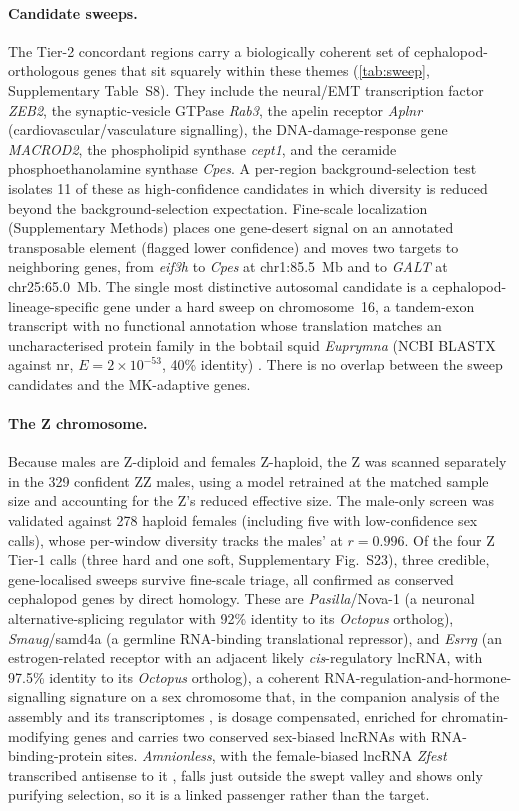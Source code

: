 \documentclass[11pt]{article}
\begin{document}
\paragraph{Candidate sweeps.}
The Tier-2 concordant regions carry a biologically coherent set of cephalopod-orthologous genes that sit
squarely within these themes (\cref{tab:sweep}, Supplementary Table~S8). They include the neural/EMT transcription factor
\textit{ZEB2}, the synaptic-vesicle GTPase \textit{Rab3}, the apelin receptor \textit{Aplnr}
(cardiovascular/vasculature signalling), the DNA-damage-response gene \textit{MACROD2}, the phospholipid
synthase \textit{cept1}, and the ceramide phosphoethanolamine synthase \textit{Cpes}. A per-region background-selection test isolates
11 of these as high-confidence candidates in which diversity is reduced beyond the background-selection expectation.
Fine-scale localization (Supplementary Methods) places one gene-desert signal on an annotated transposable element (flagged lower confidence) and moves two targets to neighboring genes, from \textit{eif3h} to \textit{Cpes} at chr1:85.5~Mb and to \textit{GALT} at chr25:65.0~Mb. The single most distinctive autosomal candidate is a cephalopod-lineage-specific gene
under a hard sweep on chromosome~16, a tandem-exon transcript with no functional annotation whose translation matches
an uncharacterised protein family in the bobtail squid \textit{Euprymna} (NCBI BLASTX against nr, $E=2\times10^{-53}$, 40\% identity) \citep{albertin2022}.
There is no overlap between the sweep candidates and the MK-adaptive genes.

\paragraph{The Z chromosome.}
Because males are Z-diploid and females Z-haploid, the Z was scanned separately in the 329 confident ZZ
males, using a model retrained at the matched sample size and accounting for the Z's reduced effective size.
The male-only screen was validated against 278 haploid females (including five with low-confidence sex calls), whose per-window diversity tracks the males' at $r=0.996$.
Of the four Z Tier-1 calls (three hard and one soft, Supplementary Fig.~S23), three credible, gene-localised sweeps survive
fine-scale triage, all confirmed as conserved cephalopod genes by direct homology. These are \textit{Pasilla}/Nova-1 (a neuronal alternative-splicing regulator with 92\% identity to its \textit{Octopus} ortholog),
\textit{Smaug}/samd4a (a germline RNA-binding translational repressor), and \textit{Esrrg} (an estrogen-related receptor with an adjacent likely \textit{cis}-regulatory lncRNA, with 97.5\% identity to its \textit{Octopus} ortholog),
a coherent RNA-regulation-and-hormone-signalling signature on a sex chromosome that, in the companion analysis of the assembly and its transcriptomes \citep{small2026}, is dosage compensated, enriched for chromatin-modifying genes and carries two conserved sex-biased lncRNAs with RNA-binding-protein sites.
\textit{Amnionless}, with the female-biased lncRNA \textit{Zfest} transcribed antisense to it \citep{small2026}, falls just outside the swept valley and 
shows only purifying selection, so it is a linked passenger rather than the target.
\end{document}
